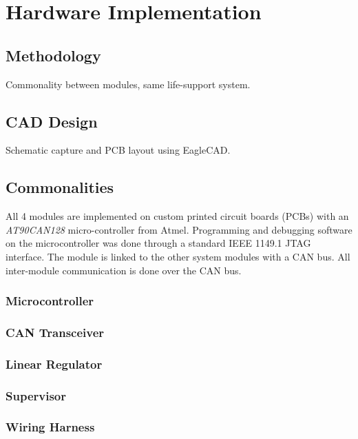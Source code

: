 \section{Hardware Implementation\label{sec:Hardware-Implementation}}


\subsection{Methodology}

Commonality between modules, same life-support system.


\subsection{CAD Design}

Schematic capture and PCB layout using EagleCAD.


\subsection{Commonalities}

All 4 modules are implemented on custom printed circuit boards (PCBs) with an \emph{AT90CAN128} micro-controller from Atmel. Programming and debugging software on the microcontroller was done through a standard IEEE 1149.1 JTAG interface. The module is linked to the other system modules with a CAN bus. All inter-module communication is done over the CAN bus.

\subsubsection{Microcontroller}


\subsubsection{CAN Transceiver}


\subsubsection{Linear Regulator}


\subsubsection{Supervisor}


\subsubsection{Wiring Harness}








